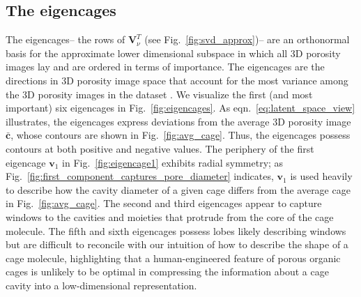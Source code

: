 \documentclass[journal=jacsat,manuscript=article,layout=traditional]{achemso}
\begin{document}
\subsection{The eigencages} The eigencages-- the rows of $\mathbf{V}_\nu^T$ (see Fig.~\ref{fig:svd_approx})-- are an orthonormal basis for the approximate lower dimensional subspace in which all 3D porosity images lay and are ordered in terms of importance. The eigencages are the directions in 3D porosity image space that account for the most variance among the 3D porosity images in the dataset \cite{strang1993introduction}. We visualize the first (and most important) six eigencages in Fig.~\ref{fig:eigencages}. As eqn.~\ref{eq:latent_space_view} illustrates, the eigencages express deviations from the average 3D porosity image $\bar{\mathbf{c}}$, whose contours are shown in Fig.~\ref{fig:avg_cage}. Thus, the eigencages possess contours at both positive and negative values. The periphery of the first eigencage $\mathbf{v}_1$ in Fig.~\ref{fig:eigencage1} exhibits radial symmetry; as Fig.~\ref{fig:first_component_captures_pore_diameter} indicates, $\mathbf{v}_1$ is used heavily to describe how the cavity diameter of a given cage differs from the average cage in Fig.~\ref{fig:avg_cage}. The second and third eigencages appear to capture windows to the cavities and moieties that protrude from the core of the cage molecule. The fifth and sixth eigencages possess lobes likely describing windows but are difficult to reconcile with our intuition of how to describe the shape of a cage molecule, highlighting that a human-engineered feature of porous organic cages is unlikely to be optimal in compressing the information about a cage cavity into a low-dimensional representation.
\end{document}
